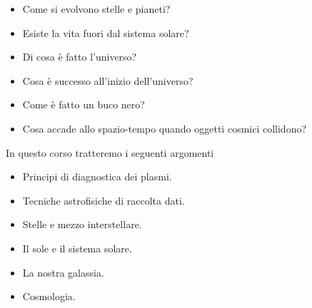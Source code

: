 \begin{itemize}
   \item Come si evolvono stelle e pianeti?
   \item Esiste la vita fuori dal sistema solare?
   \item Di cosa è fatto l'universo?
   \item Cosa è successo all'inizio dell'universo?
   \item Come è fatto un buco nero?
   \item Cosa accade allo spazio-tempo quando oggetti cosmici collidono?
\end{itemize}
In questo corso tratteremo i seguenti argomenti
\begin{itemize}
   \item Principi di diagnostica dei plasmi.
   \item Tecniche astrofisiche di raccolta dati.
   \item Stelle e mezzo interstellare.
   \item Il sole e il sistema solare.
   \item La nostra galassia.
   \item Cosmologia.
\end{itemize}